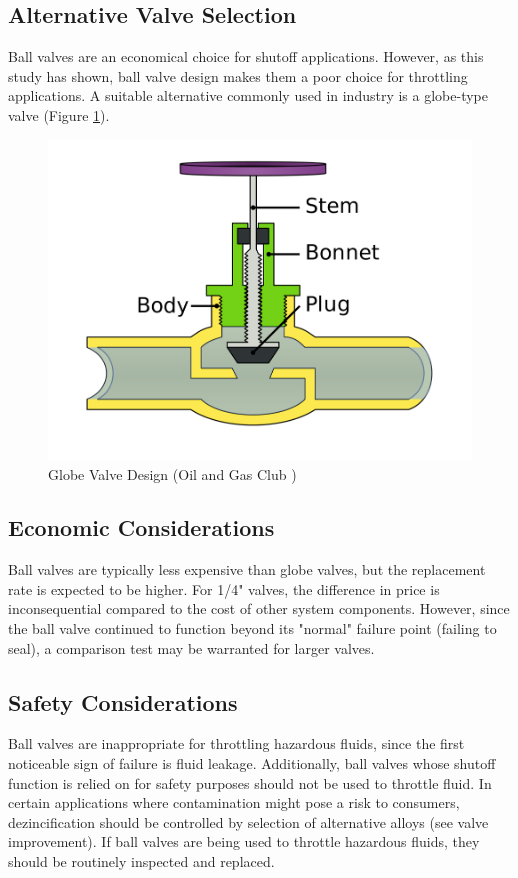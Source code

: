 \documentclass[]{article}
\begin{document}
\subsection{Alternative Valve Selection}
Ball valves are an economical choice for shutoff applications. However, as this study has shown, ball valve design makes them a poor choice for throttling applications. A suitable alternative commonly used in industry is a globe-type valve (Figure \ref{fig:GlobeValve}). 
\begin{figure}[h]
	\centering
	\includegraphics[width=0.7\linewidth]{Photos/GlobeValve}
	\caption{Globe Valve Design (Oil and Gas Club \cite{OilandGasClub})}
	\label{fig:GlobeValve}
\end{figure}

\subsection{Economic Considerations}
Ball valves are typically less expensive than globe valves, but the replacement rate is expected to be higher.  For 1/4" valves, the difference in price is inconsequential compared to the cost of other system components. However, since the ball valve continued to function beyond its "normal" failure point (failing to seal), a comparison test may be warranted for larger valves.

\subsection{Safety Considerations}
Ball valves are inappropriate for throttling hazardous fluids, since the first noticeable sign of failure is fluid leakage. Additionally, ball valves whose shutoff function is relied on for safety purposes should not be used to throttle fluid. In certain applications where contamination might pose a risk to consumers, dezincification should be controlled by selection of alternative alloys (see valve improvement). If ball valves are being used to throttle hazardous fluids, they should be routinely inspected and replaced.
\end{document}
